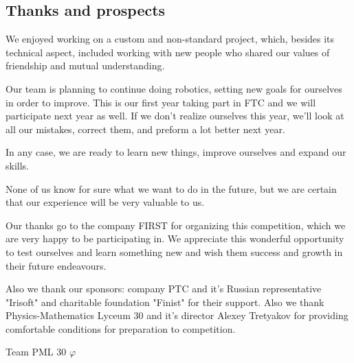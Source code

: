 
\subsection{Thanks and prospects} 
We enjoyed working on a custom and non-standard project, which, besides its technical aspect, included working with new people who shared our values of friendship and mutual understanding. 

Our team is planning to continue doing robotics, setting new goals for ourselves in order to improve. This is our first year taking part in FTC and we will participate next year as well. If we don't realize ourselves this year, we'll look at all our mistakes, correct them, and preform a lot better next year.

In any case, we are ready to learn new things, improve ourselves and expand our skills. 

None of us know for sure what we want to do in the future, but we are certain that our experience will be very valuable to us. 

Our thanks go to the company FIRST for organizing this competition, which we are very happy to be participating in. We appreciate this wonderful opportunity to test ourselves and learn something new and wish them success and growth in their future endeavours.

Also we thank our sponsors: company PTC and it's Russian representative "Irisoft" and charitable foundation "Finist" for their support. Also we thank Physics-Mathematics Lyceum 30 and it's director Alexey Tretyakov for providing comfortable conditions for preparation to competition.


\begin{center}
	Team PML 30 ${\varphi}$
\end{center}

\vspace{0.5em}

\begin{figure}[H]
	\begin{minipage}[h]{0.47\linewidth}
	\end{minipage}
	\hfill
	\begin{minipage}[h]{0.47\linewidth}
	\end{minipage}
\end{figure}

